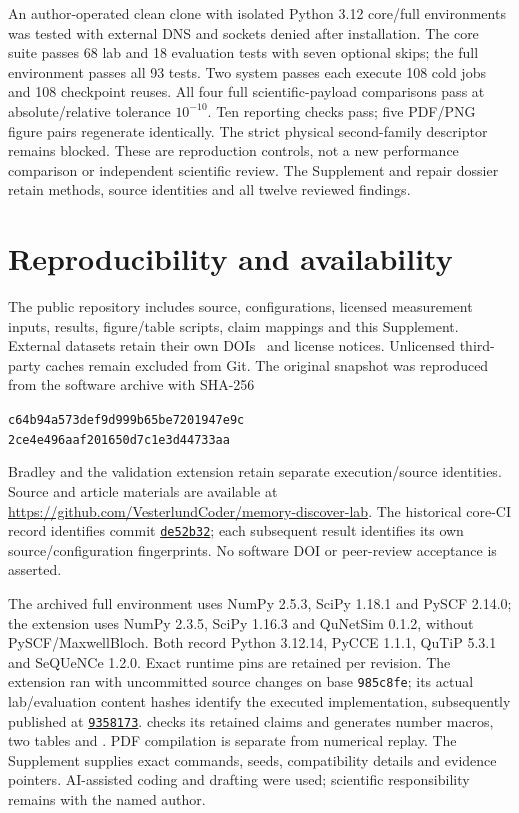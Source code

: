 \documentclass[11pt,a4paper]{article}
\newcommand{\code}[1]{\texttt{#1}}
\begin{document}
An author-operated clean clone with isolated Python 3.12 core/full environments was tested with external DNS and sockets denied after installation. The core suite passes 68 lab and 18 evaluation tests with seven optional skips; the full environment passes all 93 tests. Two system passes each execute 108 cold jobs and 108 checkpoint reuses. All four full scientific-payload comparisons pass at absolute/relative tolerance $10^{-10}$. Ten reporting checks pass; five PDF/PNG figure pairs regenerate identically. The strict physical second-family descriptor remains blocked. These are reproduction controls, not a new performance comparison or independent scientific review. The Supplement and repair dossier retain methods, source identities and all twelve reviewed findings.

\section{Reproducibility and availability}
The public repository includes source, configurations, licensed measurement inputs, results, figure/table scripts, claim mappings and this Supplement. External datasets retain their own DOIs~\cite{tellerdata,prdata,bradleydata} and license notices. Unlicensed third-party caches remain excluded from Git. The original snapshot was reproduced from the software archive with SHA-256
\par\noindent\begin{minipage}{\linewidth}\centering\small
\texttt{c64b94a573def9d999b65be7201947e9c}\\
\texttt{2ce4e496aaf201650d7c1e3d44733aa}
\end{minipage}\par
Bradley and the validation extension retain separate execution/source identities. Source and article materials are available at \url{https://github.com/VesterlundCoder/memory-discover-lab}. The historical core-CI record identifies commit \href{https://github.com/VesterlundCoder/memory-discover-lab/commit/de52b32f0c34a05cf4f6a0c01bca6ee087e6cb67}{\code{de52b32}}; each subsequent result identifies its own source/configuration fingerprints. No software DOI or peer-review acceptance is asserted.

The archived full environment uses NumPy 2.5.3, SciPy 1.18.1 and PySCF 2.14.0; the extension uses NumPy 2.3.5, SciPy 1.16.3 and QuNetSim 0.1.2, without PySCF/MaxwellBloch. Both record Python 3.12.14, PyCCE 1.1.1, QuTiP 5.3.1 and SeQUeNCe 1.2.0. Exact runtime pins are retained per revision. The extension ran with uncommitted source changes on base \code{985c8fe}; its actual lab/evaluation content hashes identify the executed implementation, subsequently published at \href{https://github.com/VesterlundCoder/memory-discover-lab/commit/935817372520428e88398235ad58ee3d9817e2ba}{\code{9358173}}.  checks its retained claims and generates number macros, two tables and . PDF compilation is separate from numerical replay. The Supplement supplies exact commands, seeds, compatibility details and evidence pointers. AI-assisted coding and drafting were used; scientific responsibility remains with the named author.
\end{document}
